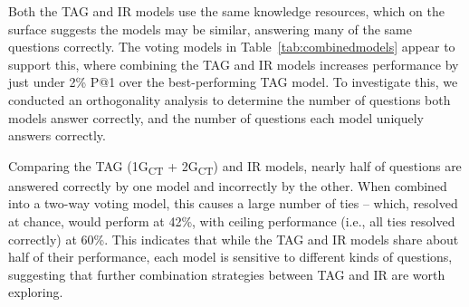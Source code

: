 {} Both the TAG and IR models use the same knowledge resources, which on the surface suggests the models may be similar, answering many of the same questions correctly.  The voting models in Table~\ref{tab:combinedmodels} appear to support this, where combining the TAG and IR models increases performance by just under 2\% P@1 over the best-performing TAG model.  To investigate this, we conducted an orthogonality analysis to determine the number of questions both models answer correctly, and the number of questions each model uniquely answers correctly.

Comparing the TAG (1G\textsubscript{CT} + 2G\textsubscript{CT}) and IR models, nearly half of questions are answered correctly by one model and incorrectly by the other.  When combined into a two-way voting model, this causes a large number of ties -- which, resolved at chance, would perform at 42\%, with ceiling performance (i.e., all ties resolved correctly) at 60\%.  This indicates that while the TAG and IR models share about half of their performance, each model is sensitive to different kinds of questions, suggesting that further combination strategies between TAG and IR are worth exploring.

